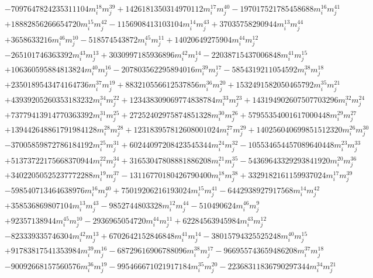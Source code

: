 {\begin{align*}
&-7097647824235311104m_i^{18}m_j^{39}+1426181350314970112m_i^{17}m_j^{40}-197017521785458688m_i^{16}m_j^{41}\\
&+18882856266654720m_i^{15}m_j^{42}-1156908413103104m_i^{14}m_j^{43}+37035758290944m_i^{13}m_j^{44}\\
&+3658633216m_i^{46}m_j^{10}-518574543872m_i^{45}m_j^{11}+14020649275904m_i^{44}m_j^{12}\\
&-265101746363392m_i^{43}m_j^{13}+3030997185936896m_i^{42}m_j^{14}-22038715437006848m_i^{41}m_j^{15}\\
&+106360595884813824m_i^{40}m_j^{16}-207803562295894016m_i^{39}m_j^{17}-5854319211054592m_i^{38}m_j^{18}\\
&+2350189543474164736m_i^{37}m_j^{19}+883210556612537856m_i^{36}m_j^{20}+1532491582050465792m_i^{35}m_j^{21}\\
&+43939205260353183232m_i^{34}m_j^{22}+123438309069774838784m_i^{33}m_j^{23}+143194902607507703296m_i^{32}m_j^{24}\\
&+73779413914770363392m_i^{31}m_j^{25}+27252402975874851328m_i^{30}m_j^{26}+57955354001617000448m_i^{29}m_j^{27}\\
&+139442648861791984128m_i^{28}m_j^{28}+123183957812608001024m_i^{27}m_j^{29}+140256040699851512320m_i^{26}m_j^{30}\\
&-37005859872786184192m_i^{25}m_j^{31}+60244097208423545344m_i^{24}m_j^{32}-105534654457089640448m_i^{23}m_j^{33}\\
&+51373722175668370944m_i^{22}m_j^{34}+31653047808881886208m_i^{21}m_j^{35}-54369643329293841920m_i^{20}m_j^{36}\\
&+34022050525237772288m_i^{19}m_j^{37}-13116770180426790400m_i^{18}m_j^{38}+3329182161159937024m_i^{17}m_j^{39}\\
&-598540713464638976m_i^{16}m_j^{40}+75019206216193024m_i^{15}m_j^{41}-6442938927917568m_i^{14}m_j^{42}\\
&+358536869807104m_i^{13}m_j^{43}-9852744803328m_i^{12}m_j^{44}-510490624m_i^{46}m_j^{9}\\
&+92357138944m_i^{45}m_j^{10}-2936965054720m_i^{44}m_j^{11}+62284563945984m_i^{43}m_j^{12}\\
&-823339335746304m_i^{42}m_j^{13}+6702642152846848m_i^{41}m_j^{14}-38015794325525248m_i^{40}m_j^{15}\\
&+91783817541353984m_i^{39}m_j^{16}-68729616906788096m_i^{38}m_j^{17}-966955743659486208m_i^{37}m_j^{18}\\
&-90092668157560576m_i^{36}m_j^{19}-995466671021917184m_i^{35}m_j^{20}-22368311836790297344m_i^{34}m_j^{21}\\

\end{align*}}

